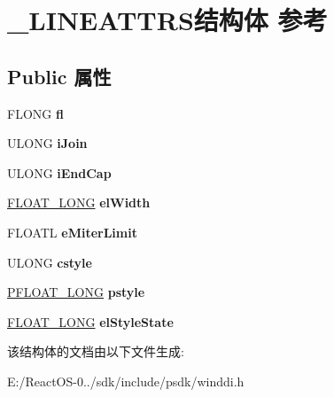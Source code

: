 \hypertarget{struct___l_i_n_e_a_t_t_r_s}{}\section{\+\_\+\+L\+I\+N\+E\+A\+T\+T\+R\+S结构体 参考}
\label{struct___l_i_n_e_a_t_t_r_s}
\subsection*{Public 属性}
\begin{DoxyCompactItemize}
\item 
\mbox{\label{struct___l_i_n_e_a_t_t_r_s_a83c11aec15e8d8ea03c5feb65735c4df}} 
F\+L\+O\+NG {\bfseries fl}
\item 
\mbox{\label{struct___l_i_n_e_a_t_t_r_s_a9bc3ff484534e9d721b4ce4a94d1c10a}} 
U\+L\+O\+NG {\bfseries i\+Join}
\item 
\mbox{\label{struct___l_i_n_e_a_t_t_r_s_a5c06905809a3176bcb04545e0f419f9d}} 
U\+L\+O\+NG {\bfseries i\+End\+Cap}
\item 
\mbox{\label{struct___l_i_n_e_a_t_t_r_s_ad6601d5ac19dd2a802ec611412d8b087}} 
\hyperlink{union___f_l_o_a_t___l_o_n_g}{F\+L\+O\+A\+T\+\_\+\+L\+O\+NG} {\bfseries el\+Width}
\item 
\mbox{\label{struct___l_i_n_e_a_t_t_r_s_afe15b4389d745219e94f5ff222f86a41}} 
F\+L\+O\+A\+TL {\bfseries e\+Miter\+Limit}
\item 
\mbox{\label{struct___l_i_n_e_a_t_t_r_s_a7dc4bfa1d9a5ba8052949c941a3ffc67}} 
U\+L\+O\+NG {\bfseries cstyle}
\item 
\mbox{\label{struct___l_i_n_e_a_t_t_r_s_a69705c53116f0269bb3fd12d6e1654f9}} 
\hyperlink{union___f_l_o_a_t___l_o_n_g}{P\+F\+L\+O\+A\+T\+\_\+\+L\+O\+NG} {\bfseries pstyle}
\item 
\mbox{\label{struct___l_i_n_e_a_t_t_r_s_a4ffee0efea15890a6802b445d5fd5fd5}} 
\hyperlink{union___f_l_o_a_t___l_o_n_g}{F\+L\+O\+A\+T\+\_\+\+L\+O\+NG} {\bfseries el\+Style\+State}
\end{DoxyCompactItemize}


该结构体的文档由以下文件生成\+:\begin{DoxyCompactItemize}
\item 
E\+:/\+React\+O\+S-\/0../sdk/include/psdk/winddi.\+h\end{DoxyCompactItemize}
